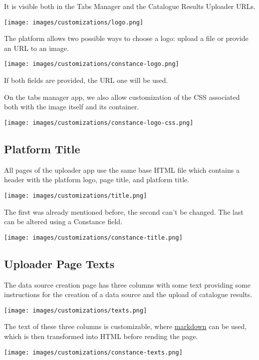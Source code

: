\documentclass[
]{book}
\begin{document}
It is visible both in the Tabs Manager and the Catalogue Results Uploader URLs.

\texttt{[image: images/customizations/logo.png]}

The platform allows two possible ways to choose a logo: upload a file or provide an URL to an image.

\texttt{[image: images/customizations/constance-logo.png]}

If both fields are provided, the URL one will be used.

On the tabs manager app, we also allow customization of the CSS associated both with the image itself and its container.

\texttt{[image: images/customizations/constance-logo-css.png]}

\hypertarget{platform-title}{%
\subsection*{Platform Title}\label{platform-title}}

All pages of the uploader app use the same base HTML file which contains a header with the platform logo, page title, and platform title.

\texttt{[image: images/customizations/title.png]}

The first was already mentioned before, the second can't be changed.
The last can be altered using a Constance field.

\texttt{[image: images/customizations/constance-title.png]}

\hypertarget{uploader-page-texts}{%
\subsection*{Uploader Page Texts}\label{uploader-page-texts}}

The data source creation page has three columns with some text providing some instructions for the creation of a data source and the upload of catalogue results.

\texttt{[image: images/customizations/texts.png]}

The text of these three columns is customizable, where \href{https://www.markdownguide.org/}{markdown} can be used, which is then transformed into HTML before rending the page.

\texttt{[image: images/customizations/constance-texts.png]}
\end{document}
